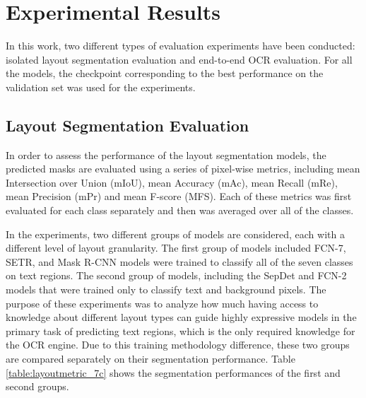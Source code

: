 \documentclass[letterpaper]{article} %
\begin{document}
\section{Experimental Results}
In this work, two different types of evaluation experiments have been conducted: isolated layout segmentation evaluation and end-to-end OCR evaluation. For all the models, the checkpoint corresponding to the best performance on the validation set was used for the experiments.
\subsection{Layout Segmentation Evaluation}

In order to assess the performance of the layout segmentation models, the predicted masks are evaluated using a series of pixel-wise metrics, including mean Intersection over Union (mIoU), mean Accuracy (mAc), mean Recall (mRe), mean Precision (mPr) and mean F-score (MFS). Each of these metrics was first evaluated for each class separately and then was averaged over all of the classes.

In the experiments, two different groups of models are considered, each with a different level of layout granularity. The first group of models included FCN-7, SETR, and Mask R-CNN models were trained to classify all of the seven classes on text regions. The second group of models, including the SepDet and FCN-2 models that were trained only to classify text and background pixels. The purpose of these experiments was to analyze how much having access to knowledge about different layout types can guide highly expressive models in the primary task of predicting text regions, which is the only required knowledge for the OCR engine. Due to this training methodology difference, these two groups are compared separately on their segmentation performance. Table  \ref{table:layoutmetric_7c}  
shows the segmentation performances of the first and second groups.
\end{document}
